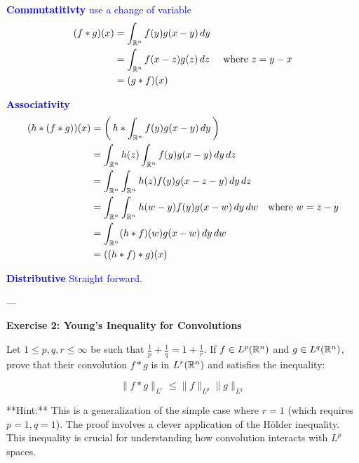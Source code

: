 \documentclass[12pt,a4paper]{report}
\newcommand{\BLUE}[1]{\textcolor{blue}{#1}}
\begin{document}
\begin{description}
\begin{description}
\BLUE{\begin{description}
	\item \textbf{Commutatitivty} use a change of variable
	\begin{align*}
		(f*g)(x) &= \int_{\mathbb{R}^n} f(y)g(x-y)\,dy \\
		 &= \int_{\mathbb{R}^n} f(x-z)g(z)\,dz & \text{ where } z = y-x\\
		 &= (g*f)(x)
	\end{align*}
	\item \textbf{Associativity}
	\begin{align*}
		(h*(f*g))(x) &= \left (\, h*\int_{\mathbb{R}^n} f(y)g(x-y)\,dy \,\right ) \\
		&= \int_{\mathbb{R}^n} h(z) \int_{\mathbb{R}^n} f(y)g(x-y)\, dy\, dz\\
		&= \int_{\mathbb{R}^n} \int_{\mathbb{R}^n}  h(z)f(y)g(x-z-y)\, dy\, dz \\ 
		&= \int_{\mathbb{R}^n} \int_{\mathbb{R}^n}  h(w-y)f(y)g(x-w)\, dy\, dw & \text{where } w = z-y\\ 
		&= \int_{\mathbb{R}^n} (h*f)(w) g(x-w)\, dy\, dw \\ 
		&= ((h*f)*g)(x)
	\end{align*}
	\item \textbf{Distributive}  Straight forward.
\end{description}
}

---

\item \textbf{Exercise 2: Young's Inequality for Convolutions}

Let \( 1 \leq p, q, r \leq \infty \) be such that \( \frac{1}{p} + \frac{1}{q} = 1 + \frac{1}{r} \). If \( f \in L^p(\mathbb{R}^n) \) and \( g \in L^q(\mathbb{R}^n) \), prove that their convolution \( f * g \) is in \( L^r(\mathbb{R}^n) \) and satisfies the inequality:

\[ \|f * g\|_{L^r} \leq \|f\|_{L^p} \|g\|_{L^q} \]

**Hint:** This is a generalization of the simple case where \( r=1 \) (which requires \( p=1, q=1 \)). The proof involves a clever application of the Hölder inequality. This inequality is crucial for understanding how convolution interacts with \( L^p \) spaces.


\end{description}
\end{description}
\end{document}
